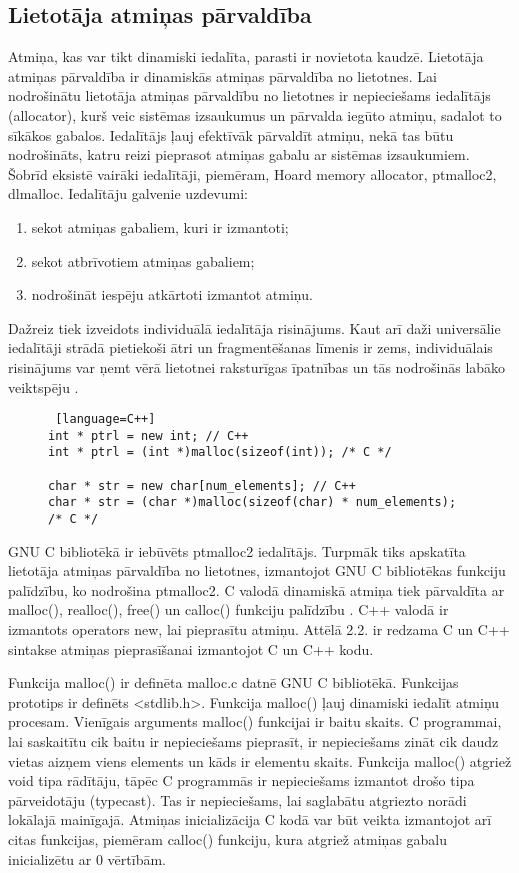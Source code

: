 \subsection{Lietotāja atmiņas pārvaldība}
Atmiņa, kas var tikt dinamiski iedalīta, parasti ir novietota kaudzē. 
Lietotāja atmiņas pārvaldība ir dinamiskās atmiņas pārvaldība no lietotnes.
Lai nodrošinātu lietotāja atmiņas pārvaldību no lietotnes ir nepieciešams iedalītājs (allocator), kurš veic sistēmas izsaukumus un pārvalda iegūto atmiņu, sadalot to sīkākos gabalos.
Iedalītājs ļauj efektīvāk pārvaldīt atmiņu, nekā tas būtu nodrošināts, katru reizi pieprasot atmiņas gabalu ar sistēmas izsaukumiem.
Šobrīd eksistē vairāki iedalītāji, piemēram, Hoard memory allocator, ptmalloc2, dlmalloc.
Iedalītāju galvenie uzdevumi: 
\begin{enumerate}
\item sekot atmiņas gabaliem, kuri ir izmantoti;
\item sekot atbrīvotiem atmiņas gabaliem;
\item nodrošināt iespēju atkārtoti izmantot atmiņu.
\end{enumerate}
Dažreiz tiek izveidots individuālā iedalītāja risinājums. 
Kaut arī daži universālie iedalītāji strādā pietiekoši ātri un fragmentēšanas līmenis ir zems, individuālais risinājums var ņemt vērā lietotnei raksturīgas īpatnības un tās nodrošinās labāko veiktspēju \cite{EDBG}.
\begin{figure}[h]
\begin{lstlisting} [language=C++]
int * ptrl = new int; // C++
int * ptrl = (int *)malloc(sizeof(int)); /* C */

char * str = new char[num_elements]; // C++
char * str = (char *)malloc(sizeof(char) * num_elements); /* C */
\end{lstlisting}
\caption{\textbf{\fontsize{11}{12}\selectfont {Dinamiskās atmiņas iedalīšana C un C++}}}
\end{figure}

GNU C bibliotēkā ir iebūvēts ptmalloc2 iedalītājs.
Turpmāk tiks apskatīta lietotāja atmiņas pārvaldība no lietotnes, izmantojot GNU C bibliotēkas funkciju palīdzību, ko nodrošina ptmalloc2.
C valodā dinamiskā atmiņa tiek pārvaldīta ar malloc(), realloc(), free() un calloc() funkciju palīdzību \cite {PETRSOF}.
C++ valodā ir izmantots operators new, lai pieprasītu atmiņu. 
Attēlā 2.2. ir redzama C un C++ sintakse atmiņas pieprasīšanai izmantojot C un C++ kodu.


Funkcija malloc() ir definēta malloc.c datnē GNU C bibliotēkā. 
Funkcijas prototips ir definēts <stdlib.h>.
Funkcija malloc() ļauj dinamiski iedalīt atmiņu procesam.
Vienīgais arguments malloc() funkcijai ir baitu skaits.
C programmai, lai saskaitītu cik baitu ir nepieciešams pieprasīt, ir nepieciešams zināt cik daudz vietas aizņem viens elements un kāds ir elementu skaits.
Funkcija malloc() atgriež void tipa rādītāju, tāpēc C programmās ir nepieciešams izmantot drošo tipa pārveidotāju (typecast). 
Tas ir nepieciešams, lai saglabātu atgriezto norādi lokālajā mainīgajā. Atmiņas inicializācija C kodā
var būt veikta izmantojot arī citas funkcijas, piemēram calloc() funkciju, kura atgriež atmiņas gabalu inicializētu ar 0 vērtībām.

